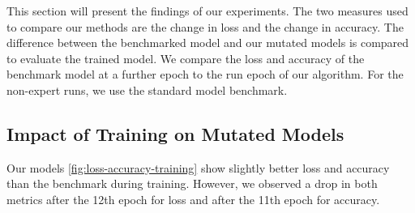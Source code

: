 This section will present the findings of our experiments.
The two measures used to compare our methods are the change in loss and the change in accuracy.
The difference between the benchmarked model and our mutated models is compared to evaluate the trained model.
We compare the loss and accuracy of the benchmark model at a further epoch to the run epoch of our algorithm.
For the non-expert runs, we use the standard model benchmark.
\subsection{Impact of Training on Mutated Models}\label{subsec:impact-of-training-on-mutated-models}
Our models \ref{fig:loss-accuracy-training} show slightly better loss and accuracy than the benchmark during training.
However, we observed a drop in both metrics after the 12th epoch for loss and after the 11th epoch for accuracy.

